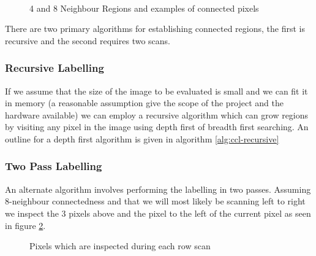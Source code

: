 \begin{figure}[h!]
  \centering
  \quad
  \\
  \quad

  \caption{4 and 8 Neighbour Regions and examples of connected pixels}
  \label{fig:pixel-neighbours}
\end{figure}

There are two primary algorithms for establishing connected regions, the first is recursive and the second requires two scans.

\subsubsection{Recursive Labelling}

If we assume that the size of the image to be evaluated is small and we can fit it in memory (a reasonable assumption give the scope of the project and the hardware available) we can employ a recursive algorithm which can grow regions by visiting any pixel in the image using depth first of breadth first searching. An outline for a depth first algorithm is given in algorithm \ref{alg:ccl-recursive}



\subsubsection{Two Pass Labelling}

An alternate algorithm involves performing the labelling in two passes. Assuming 8-neighbour connectedness and that we will most likely be scanning left to right we inspect the 3 pixels above and the pixel to the left of the current pixel as seen in figure \ref{fig:scan-neighbours}.

\begin{figure}[h!]
  \centering
  
  \caption{Pixels which are inspected during each row scan}
  \label{fig:scan-neighbours}
\end{figure}

